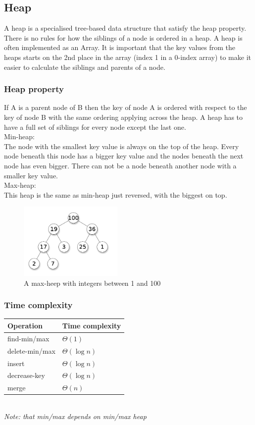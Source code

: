 \documentclass[a4paper, 10pt]{article}
\begin{document}
\subsection{Heap}
A heap is a specialised tree-based data structure that satisfy the heap property.
There is no rules for how the siblings of a node is ordered in a heap.
A heap is often implemented as an Array. It is important that the key values from the heaps starts on the 2nd place in the array (index 1 in a 0-index array) to make it easier to calculate the siblings and parents of a node.

\subsubsection{Heap property}
If A is a parent node of B then the key of node A is ordered with respect to the key of node B with the same ordering applying across the heap. A heap has to have a full set of siblings for every node except the last one.\\

Min-heap:\\
The node with the smallest key value is always on the top of the heap. Every node beneath this node has a bigger key value and the nodes beneath the next node has even bigger. There can not be a node beneath another node with a smaller key value. \\


Max-heap:\\
This heap is the same as min-heap just reversed, with the biggest on top.

\begin{figure}[hbt]
    \begin{center}
        \includegraphics[width=5cm] {img/maxheap.png}
	\caption{A max-heep with integers between 1 and 100}
    \end{center}
\end{figure}

\subsubsection{Time complexity}
\begin{tabular}{|l|l|}
	\hline
	Operation      & Time complexity \\ \hline
	find-min/max   & $\Theta(1)$ \\ \hline
	delete-min/max & $\Theta(\log n)$ \\ \hline
	insert         & $\Theta(\log n)$               \\ \hline
	decrease-key   & $\Theta(\log n)$              \\ \hline
	merge          & $\Theta(n)$ \\ \hline
\end{tabular}\\
\textit{Note: that min/max depends on min/max heap}
\end{document}
